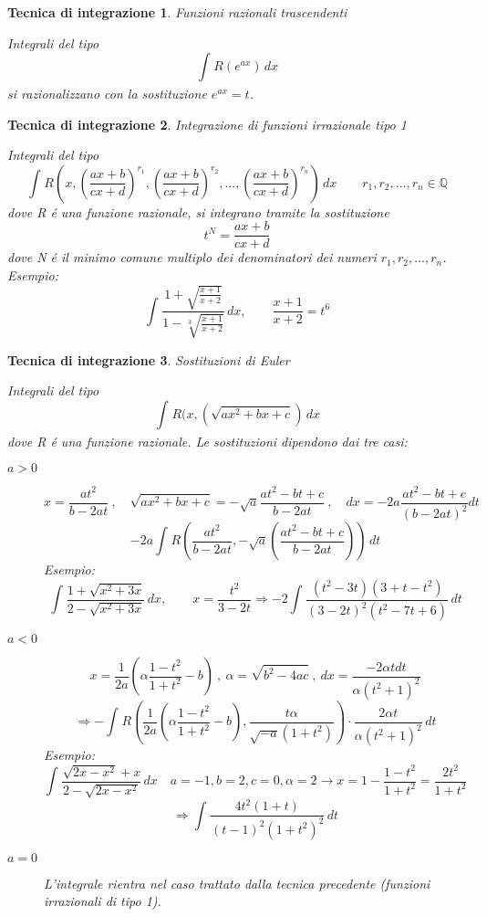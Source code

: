 \documentclass[a4paper, titlepage]{report}%
\theoremstyle{definition} %
\theoremstyle{plain}
\theoremstyle{plain}
\theoremstyle{remark}
\theoremstyle{remark}
\theoremstyle{plain}
\theoremstyle{plain}
\theoremstyle{plain}
\theoremstyle{plain}
\theoremstyle{plain}
\newtheorem*{tecnica}{Tecnica di integrazione}
\begin{document}
\begin{tecnica}{Funzioni razionali trascendenti}

   Integrali del tipo 
\[
    \int_{}^{} R(e^{ax}) \,dx         
\]
si razionalizzano con la sostituzione $e^{ax} = t$.
    
\end{tecnica}
\begin{tecnica}{Integrazione di funzioni irrazionale tipo 1}
    
    Integrali del tipo 
    \[
        \int_{}^{} R(x,(\frac{ax+b}{cx+d})^{r_1},
        (\frac{ax+b}{cx+d})^{r_2},...,
        (\frac{ax+b}{cx+d})^{r_n}) \,dx  
        \qquad r_1,r_2,...,r_n \in \mathbb{Q}      
    \]
dove R \'e una funzione razionale, si integrano tramite la sostituzione
\[
   t^N = \frac{ax+b}{cx+d}    
\]
dove N \'e il minimo comune multiplo dei denominatori dei numeri
 $r_1,r_2,...,r_n$. \\
Esempio:
\[
    \int_{}^{} \frac{1+\sqrt{\frac{x+1}{x+2}}}{1- \sqrt[3]{
     \frac{x+1}{x+2}}}\, dx , \qquad \frac{x+1}{x+2} = t^6
\]
\end{tecnica}
\begin{tecnica}{Sostituzioni di Euler}
    
    Integrali del tipo 
    \[
        \int_{}^{} R(x,(\sqrt{ax^2+bx+c}) \, dx      
    \]
dove R \'e una funzione razionale. Le sostituzioni dipendono dai tre casi:
\begin{description}
    \item[$a>0$] 
    \[
      x = \frac{at^2}{b-2at} \ , \quad \sqrt{ax^2+bx+c} = -\sqrt{a}\frac{at^2-bt+c}
      {b-2at} \ , \quad dx = -2a\frac{at^2-bt+c}{(b-2at)^2}dt
    \] 
    \[
       -2a \int_{}^{} R(\frac{at^2}{b-2at}  ,  -\sqrt{a}(\frac{at^2-bt+c}{b-2at}))
       \, dt    
    \]
    Esempio: 
    \[
    \int_{}^{} \frac{1+\sqrt{x^2+3x}}{2-\sqrt{x^2+3x}} \, dx , \qquad x = \frac{t^2}{3-2t}
    \Longrightarrow -2\int_{}^{} \frac{(t^2-3t)(3+t-t^2)}{(3-2t)^2(t^2-7t+6)} \, dt
    \]

    \item[$a<0$]
    \[
    x = \frac{1}{2a}(\alpha \frac{1-t^2}{1+t^2}-b) \ , \ \alpha = \sqrt{b^2-4ac}  
    \ , \ dx = \frac{-2\alpha t dt}{\alpha(t^2+1)^2}  
    \]
    \[
        \Longrightarrow
       - \int_{}^{} R(\frac{1}{2a}(\alpha \frac{1-t^2}{1+t^2}-b), 
       \frac{t\alpha }{\sqrt{-a}(1+t^2)}) \cdot \frac{2\alpha t}{\alpha(t^2+1)^2}
       \, dt
    \]
    Esempio:
    \[
    \int_{}^{} \frac{\sqrt{2x-x^2}+x}{2-\sqrt{2x-x^2}} \, dx
     \quad a = -1,b = 2, c= 0, \alpha = 2 \longrightarrow x = 1- \frac{1-t^2}
     {1+t^2} = \frac{2t^2}{1+t^2}   
    \]
    \[
      \Longrightarrow \int_{}^{} \frac{4t^2(1+t)}{(t-1)^2(1+t^2)^2}\,dt    
    \]
     
    \item[$a=0$] L'integrale rientra nel caso trattato dalla tecnica precedente
    (funzioni irrazionali di tipo 1).  
\end{description}

\end{tecnica}
\end{document}
